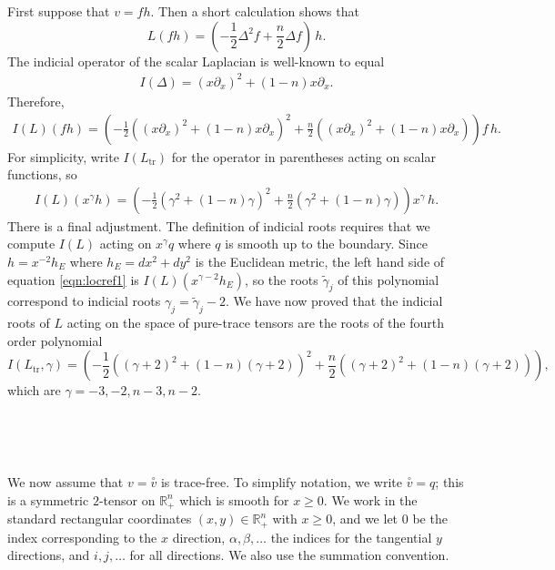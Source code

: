 \documentclass[10pt,reqno]{amsart}
\newcommand{\del}{\partial}
\newcommand{\RR}{\mathbb R}
\DeclareMathOperator{\tr}{tr}
\newcommand{\ttv}{\stackrel{\circ}{v}}
\begin{document}
\


\

First suppose that $v = f  h$. Then a short calculation shows that
\[
L( f h) = \left( -\frac12 \Delta^2 f + \frac{n}{2} \Delta f \right) \, h.
\]
The indicial operator of the scalar Laplacian is well-known to equal
\begin{align*}
I(\Delta) = (x\del_x)^2 + (1-n)x\del_x.
\end{align*}
Therefore, 
\begin{align*}
I(L) ( f h)  = \left(-\frac12 ( (x\del_x)^2 + (1-n)x\del_x)^2 + \frac{n}{2} ( (x\del_x)^2 + (1-n)x\del_x)\right) f\, h.
\end{align*}
For simplicity, write $I(L_{\tr})$ for the operator in parentheses acting on scalar functions, so 
\begin{align} \label{eqn:locref1}
I(L) (x^\gamma h) = \left(-\frac12 ( \gamma^2 + (1-n)\gamma)^2 + \frac{n}{2} (\gamma^2 + (1-n)\gamma)\right) x^\gamma \, h.
\end{align}
There is a final adjustment. The definition of indicial roots requires that we compute $I(L)$ acting on $x^\gamma q$ where
$q$ is smooth up to the boundary. Since $h = x^{-2} h_E$ where $h_E = dx^2 + dy^2$ is the Euclidean metric, the left
hand side of equation \eqref{eqn:locref1} is $I(L) (x^{\gamma-2} h_E)$, so the roots $\tilde{\gamma}_j$ of this polynomial correspond to indicial roots
$\gamma_j = \tilde{\gamma}_j - 2$. We have now proved that the indicial roots of $L$ acting on the space of pure-trace tensors are the roots
of the fourth order polynomial 
\begin{equation}
I(L_{\tr},\gamma ) = \left(-\frac12 ( (\gamma + 2)^2 + (1-n)(\gamma + 2))^2 + \frac{n}{2} ((\gamma + 2)^2 + (1-n)(\gamma + 2))\right),
\label{indroots-pt}
\end{equation}
which are $\gamma = -3, -2, n-3, n-2.$

\


\

We now assume that $v = \ttv$ is trace-free. To simplify notation, we write $\ttv = q$; this is a symmetric $2$-tensor on $\RR^n_+$ which is smooth for $x \geq 0$.  
We work in the standard rectangular coordinates $(x,y) \in \RR^n_+$ with $x \geq 0$, and we let $0$ be the index corresponding to the $x$ direction, $\alpha, \beta, \ldots$
the indices for the tangential $y$ directions, and $i, j, \ldots$ for all directions.  We also use the summation convention.
\end{document}
